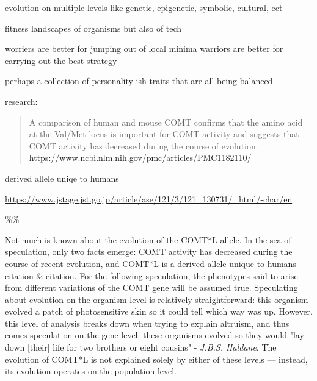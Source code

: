 \documentclass[letterpaper]{article}
\begin{document}
evolution on multiple levels like genetic, epigenetic, symbolic,
cultural, ect

fitness landscapes of organisms but also of tech

worriers are better for jumping out of local minima warriors are better
for carrying out the best strategy

perhaps a collection of personality-ish traits that are all being
balanced

research:

\begin{quote}
A comparison of human and mouse COMT confirms that the amino acid at
the Val/Met locus is important for COMT activity and suggests that
COMT activity has decreased during the course of evolution.
\url{https://www.ncbi.nlm.nih.gov/pmc/articles/PMC1182110/}
\end{quote}

derived allele uniqe to humans

\url{https://www.jstage.jst.go.jp/article/ase/121/3/121\_130731/\_html/-char/en}

\%\%

Not much is known about the evolution of the COMT*L allele. In the sea
of speculation, only two facts emerge: COMT activity has decreased
during the course of recent evolution, and COMT*L is a derived allele
unique to humans
\href{https://www.ncbi.nlm.nih.gov/pmc/articles/PMC1182110/}{citation} \&
\href{https://www.jstage.jst.go.jp/article/ase/121/3/121\_130731/\_html/-char/en}{citation}.
For the following speculation, the phenotypes said to arise from
different variations of the COMT gene will be assumed true. Speculating
about evolution on the organism level is relatively straightforward:
this organism evolved a patch of photosensitive skin so it could tell
which way was up. However, this level of analysis breaks down when
trying to explain altruism, and thus comes speculation on the gene
level: these organisms evolved so they would "lay down [their] life for
two brothers or eight cousins" - \emph{J.B.S. Haldane}. The evolution of
COMT*L is not explained solely by either of these levels --- instead,
its evolution operates on the population level.
\end{document}
